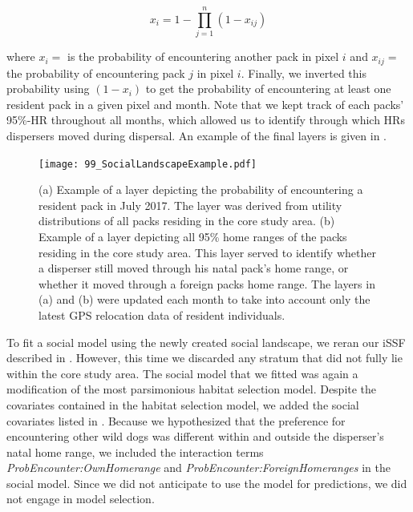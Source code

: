 \documentclass[abstract=on,10pt,a4paper,bibliography=totocnumbered]{scrartcl}
\begin{document}
\begin{equation}
\label{EQ4}
x_i = 1 - \prod_{j = 1}^{n} (1 - x_{ij})
\end{equation}

\noindent where \(x_i =\) is the probability of encountering another pack in
pixel \(i\) and \(x_{ij} =\) the probability of encountering pack \(j\) in pixel
\(i\). Finally, we inverted this probability using \((1-x_i)\) to get the
probability of encountering at least one resident pack in a given pixel and
month. Note that we kept track of each packs' 95\%-HR throughout all months,
which allowed us to identify through which HRs dispersers moved during
dispersal. An example of the final layers is given in
.

\begin{figure}[h]
  \begin{center}
    \texttt{[image: 99\_SocialLandscapeExample.pdf]}
    \caption{(a) Example of a layer depicting the probability of encountering a
    resident pack in July 2017. The layer was derived from utility distributions
    of all packs residing in the core study area. (b) Example of a layer
    depicting all 95\% home ranges of the packs residing in the core study area.
    This layer served to identify whether a disperser still moved through his
    natal pack's home range, or whether it moved through a foreign packs home
    range. The layers in (a) and (b) were updated each month to take into
    account only the latest GPS relocation data of resident individuals.}
    \label{SocialLandscapeExample}
  \end{center}
\end{figure}

\noindent To fit a social model using the newly created social landscape, we
reran our iSSF described in . However, this time we discarded any
stratum that did not fully lie within the core study area. The social model that
we fitted was again a modification of the most parsimonious habitat selection
model. Despite the covariates contained in the habitat selection model, we added
the social covariates listed in . Because we hypothesized
that the preference for encountering other wild dogs was different within and
outside the disperser's natal home range, we included the interaction terms
\textit{ProbEncounter:OwnHomerange} and \textit{ProbEncounter:ForeignHomeranges}
in the social model. Since we did not anticipate to use the model for
predictions, we did not engage in model selection.
\end{document}
